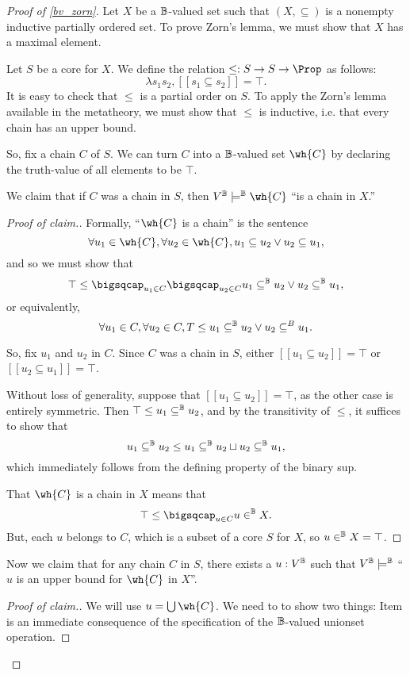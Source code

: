 \documentclass[11pt]{article}
\begin{document}
\begin{proof}[Proof of \ref{bv_zorn}]
  Let $X$ be a $\mathbb{B}$-valued set such that $(X, \subseteq)$ is a nonempty inductive partially ordered set. To prove Zorn's lemma, we must show that $X$ has a maximal element.

  Let $S$ be a core for $X$. We define the relation $\leq : S \to S \to \Prop$ as follows:
  $$
\lambda s_1 s_2, [[s_1 \subseteq s_2]] = \top.
$$
It is easy to check that $\leq$ is a partial order on $S$. To apply the Zorn's lemma available in the metatheory, we must show that $\leq$ is inductive, i.e. that every chain has an upper bound.

So, fix a chain $C$ of $S$. We can turn $C$ into a $\mathbb{B}$-valued set $\wh{C}$ by declaring the truth-value of all elements to be $\top$.

We claim that if $C$ was a chain in $S$, then $V^\B \models^\B \wh{C}$ ``is a chain in $X$.''
\begin{proof}[Proof of claim.]
  Formally, ``$\wh{C}$ is a chain'' is the sentence
  $$
\forall u_1 \in \wh{C}, \forall u_2 \in \wh{C}, u_1 \subseteq u_2 \lor u_2 \subseteq u_1,
$$
and so we must show that
$$
\top \leq \bigsqcap_{u_1 \in C} \bigsqcap_{u_2 \in C} u_1 \subseteq^\B u_2 \lor u_2 \subseteq^\B u_1,
$$
or equivalently,
$$
\forall u_1 \in C, \forall u_2 \in C, T \leq u_1 \subseteq^{\mathbb{B}} u_2 \lor u_2 \subseteq^B u_1.
$$

So, fix $u_1$ and $u_2$ in $C$. Since $C$ was a chain in $S$, either $[[u_1 \subseteq u_2]] = \top$ or $[[u_2 \subseteq u_1]] = \top$. 

Without loss of generality, suppose that $[[u_1 \subseteq u_2]] = \top$, as the other case is entirely symmetric. Then $\top \leq u_1 \subseteq^{\mathbb{B}} u_2$, and by the transitivity of $\leq$, it suffices to show that
$$
u_1 \subseteq^{\mathbb{B}} u_2 \leq u_1 \subseteq^{\mathbb{B}} u_2 \sqcup u_2 \subseteq^{\mathbb{B}} u_1,
$$
which immediately follows from the defining property of the binary sup.

That $\wh{C}$ is a chain in $X$ means that
$$
\top \leq \bigsqcap_{u \in C} u \in^\B X.
$$
But, each $u$ belongs to $C$, which is a subset of a core $S$ for $X$, so $u \in^{\mathbb{B}} X = \top$.
\end{proof}

Now we claim that for any chain $C$ in $S$, there exists a $u : V^{\mathbb{B}}$ such that $V^{\mathbb{B}} \models^{\mathbb{B}}$ ``$u$ is an upper bound for $\wh{C}$ in $X$''.

\begin{proof}[Proof of claim.]
  We will use $u = \bigcup \wh{C}$. We need to to show two things:
  Item  is an immediate consequence of the specification of the $\mathbb{B}$-valued unionset operation.


\end{proof}
\end{proof}
\end{document}
